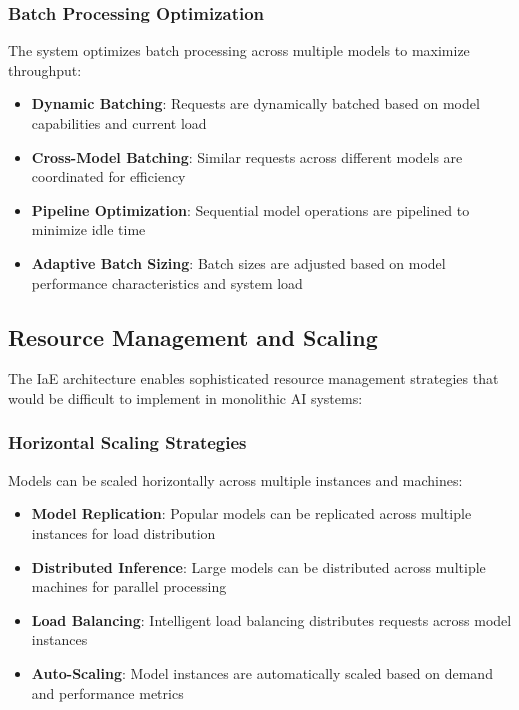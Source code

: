 \subsubsection{Batch Processing Optimization}

The system optimizes batch processing across multiple models to maximize throughput:

\begin{itemize}
    \item \textbf{Dynamic Batching}: Requests are dynamically batched based on model capabilities and current load
    \item \textbf{Cross-Model Batching}: Similar requests across different models are coordinated for efficiency
    \item \textbf{Pipeline Optimization}: Sequential model operations are pipelined to minimize idle time
    \item \textbf{Adaptive Batch Sizing}: Batch sizes are adjusted based on model performance characteristics and system load
\end{itemize}

\subsection{Resource Management and Scaling}

The IaE architecture enables sophisticated resource management strategies that would be difficult to implement in monolithic AI systems:

\subsubsection{Horizontal Scaling Strategies}

Models can be scaled horizontally across multiple instances and machines:

\begin{itemize}
    \item \textbf{Model Replication}: Popular models can be replicated across multiple instances for load distribution
    \item \textbf{Distributed Inference}: Large models can be distributed across multiple machines for parallel processing
    \item \textbf{Load Balancing}: Intelligent load balancing distributes requests across model instances
    \item \textbf{Auto-Scaling}: Model instances are automatically scaled based on demand and performance metrics
\end{itemize}

